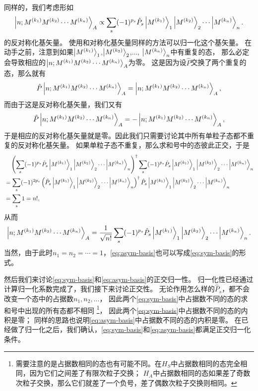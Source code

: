 \documentclass[hyperref, UTF8, a4paper]{ctexart}
\begin{document}
同样的，我们考虑形如
\[
    \ket{n; M^{(k_1)} M^{(k_2)} \cdots M^{(k_n)}}_A \propto \sum_s (-1)^{p_s} \hat{P}_s \ket{M^{(k_1)}}_1 \ket{M^{(k_2)}}_2 \cdots \ket{M^{(k_n)}}_n.
\]
的反对称化基矢量。
使用和对称化基矢量同样的方法可以归一化这个基矢量。
在动手之前，注意到如果$\ket{M^{(k_1)}}_1$,$\ket{M^{(k_2)}}_2$,..., $\ket{M^{(k_n)}}_n$中有重复的态，
那么必定会导致相应的$\ket{n; M^{(k_1)} M^{(k_2)} \cdots M^{(k_n)}}_A$为零。
这是因为设$\hat{P}$交换了两个重复的态，那么就有
\[
    \hat{P} \ket{n; M^{(k_1)} M^{(k_2)} \cdots M^{(k_n)}}_A = \ket{n; M^{(k_1)} M^{(k_2)} \cdots M^{(k_n)}}_A,
\]
而由于这是反对称化基矢量，我们又有
\[
    \hat{P} \ket{n; M^{(k_1)} M^{(k_2)} \cdots M^{(k_n)}}_A = - \ket{n; M^{(k_1)} M^{(k_2)} \cdots M^{(k_n)}}_A,
\]
于是相应的反对称化基矢量就是零。因此我们只需要讨论其中所有单粒子态都不重复的反对称化基矢量。
如果单粒子态不重复，那么求和号中的态彼此正交，于是
\[
    \begin{aligned}
        &\quad \left(\sum_s (-1)^{p_s} \hat{P}_s \ket{M^{(k_1)}}_1 \ket{M^{(k_2)}}_2 \cdots \ket{M^{(k_n)}}_n\right)^\dagger \sum_s (-1)^{p_s} \hat{P}_s \ket{M^{(k_1)}}_1 \ket{M^{(k_2)}}_2 \cdots \ket{M^{(k_n)}}_n \\
        &= \sum_s (-1)^{2p_s} \left(\hat{P}_s \ket{M^{(k_1)}}_1 \ket{M^{(k_2)}}_2 \cdots \ket{M^{(k_n)}}_n\right)^\dagger \hat{P}_s \ket{M^{(k_1)}}_1 \ket{M^{(k_2)}}_2 \cdots \ket{M^{(k_n)}}_n \\
        &= \sum_s 1 = n!,
    \end{aligned}
\]
从而
\begin{equation}
    \ket{n; M^{(k_1)} M^{(k_2)} \cdots M^{(k_n)}}_A 
    = \frac{1}{\sqrt{n!}} \sum_s (-1)^{p_s} \hat{P}_s \ket{M^{(k_1)}}_1 \ket{M^{(k_2)}}_2 \cdots \ket{M^{(k_n)}}_n.
    \label{eq:asym-basis}
\end{equation}
当然，由于此时$n_1 = n_2 = \cdots = 1$，\eqref{eq:asym-basis}也可以写成\eqref{eq:sym-basis}的形式。

然后我们来讨论\eqref{eq:sym-basis}和\eqref{eq:asym-basis}的正交归一性。
归一化性已经通过计算归一化系数完成了，我们接下来讨论正交性。
无论作用怎么样的$\hat{P}_s$，都不会改变一个态中的占据数$n_1, n_2, \ldots$，
因此两个\eqref{eq:sym-basis}中占据数不同的态的求和号中出现的所有态都不相同%
\footnote{需要注意的是占据数相同的态也有可能不同。在$H_S$中占据数相同的态完全相同，因为它们之间差了有限次粒子交换；
$H_A$中占据数相同的态如果差了奇数次粒子交换，那么它们就差了一个负号，差了偶数次粒子交换则相同。}，
因此两个\eqref{eq:sym-basis}中占据数不同的态的内积是零；
同样的思路也说明\eqref{eq:asym-basis}中占据数不同的态的内积是零。
在已经做了归一化之后，我们确认，\eqref{eq:sym-basis}和\eqref{eq:asym-basis}都满足正交归一化条件。
\end{document}
